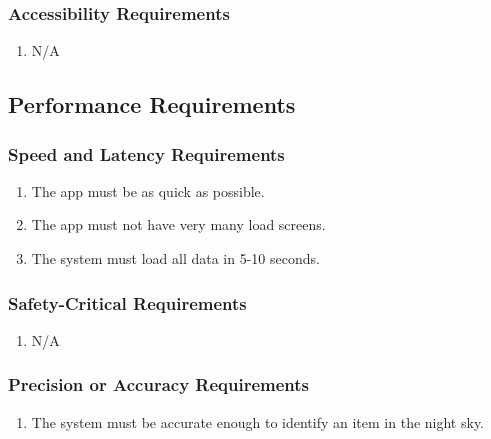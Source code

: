 \documentclass[]{article}
\begin{document}
\begin{enumerate}[{VP}1.]
\subsubsection{Accessibility Requirements}
\label{ssub:accessibility_requirements}
\begin{enumerate}[{UH}1. ]
	\item N/A
\end{enumerate}


\subsection{Performance Requirements}
\label{sub:performance_requirements}

\subsubsection{Speed and Latency Requirements}
\label{ssub:speed_and_latency_requirements}
\begin{enumerate}[{PR}1. ]
	\item The app must be as quick as possible.
	\item The app must not have very many load screens.
	\item The system must load all data in 5-10 seconds.
\end{enumerate}

\subsubsection{Safety-Critical Requirements}
\label{ssub:safety_critical_requirements}
\begin{enumerate}[{PR}1. ]
	\item N/A
\end{enumerate}

\subsubsection{Precision or Accuracy Requirements}
\label{ssub:precision_or_accuracy_requirements}
\begin{enumerate}[{PR}1. ]
	\item The system must be accurate enough to identify an item in the night sky.
\end{enumerate}


\end{enumerate}
\end{document}
